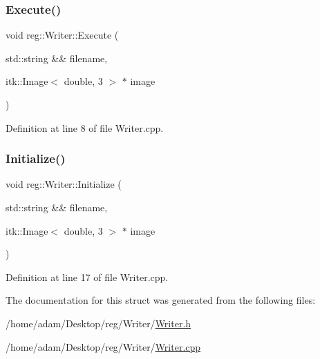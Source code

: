 \subsubsection{\texorpdfstring{Execute()}{Execute()}}
{\footnotesize\ttfamily void reg\+::\+Writer\+::\+Execute (\begin{DoxyParamCaption}\item[{std\+::string \&\&}]{filename,  }\item[{itk\+::\+Image$<$ double, 3 $>$ $\ast$}]{image }\end{DoxyParamCaption})}



Definition at line 8 of file Writer.\+cpp.

\mbox{\label{structreg_1_1_writer_af64428b12094aa95d2ee441e6150d409}} 
\subsubsection{\texorpdfstring{Initialize()}{Initialize()}}
{\footnotesize\ttfamily void reg\+::\+Writer\+::\+Initialize (\begin{DoxyParamCaption}\item[{std\+::string \&\&}]{filename,  }\item[{itk\+::\+Image$<$ double, 3 $>$ $\ast$}]{image }\end{DoxyParamCaption})}



Definition at line 17 of file Writer.\+cpp.



The documentation for this struct was generated from the following files\+:\begin{DoxyCompactItemize}
\item 
/home/adam/\+Desktop/reg/\+Writer/\hyperlink{_writer_8h}{Writer.\+h}\item 
/home/adam/\+Desktop/reg/\+Writer/\hyperlink{_writer_8cpp}{Writer.\+cpp}\end{DoxyCompactItemize}
